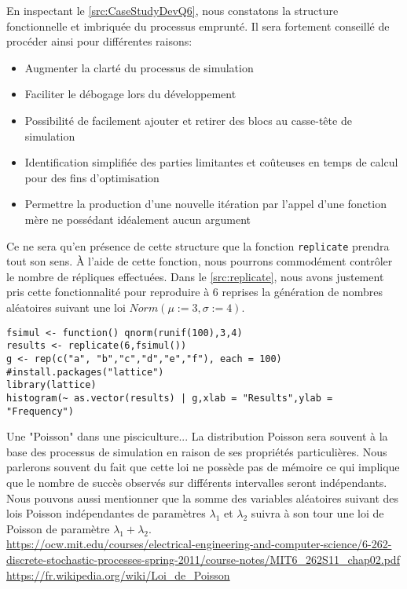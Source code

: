 En inspectant le \autoref{src:CaseStudyDevQ6}, nous constatons la structure fonctionnelle et imbriquée du processus emprunté. Il sera fortement conseillé de procéder ainsi pour différentes raisons:

\begin{itemize}
	\item Augmenter la clarté du processus de simulation
	\item Faciliter le débogage lors du développement
	\item Possibilité de facilement ajouter et retirer des blocs au casse-tête de simulation
	\item Identification simplifiée des parties limitantes et coûteuses en temps de calcul pour des fins d'optimisation
	\item Permettre la production d'une nouvelle itération par l'appel d'une fonction mère ne possédant idéalement aucun argument
\end{itemize}

Ce ne sera qu'en présence de cette structure que la fonction \texttt{replicate} prendra tout son sens. À l'aide de cette fonction, nous pourrons commodément contrôler le nombre de répliques effectuées. Dans le \autoref{src:replicate}, nous avons justement pris cette fonctionnalité pour reproduire à 6 reprises la génération de nombres aléatoires suivant une loi $Norm(\mu := 3, \sigma := 4)$.

\begin{lstlisting}[caption = Replication d'une analyse par simulation,label=src:replicate]
fsimul <- function() qnorm(runif(100),3,4)
results <- replicate(6,fsimul())
g <- rep(c("a", "b","c","d","e","f"), each = 100)
#install.packages("lattice")
library(lattice)
histogram(~ as.vector(results) | g,xlab = "Results",ylab = "Frequency") 
\end{lstlisting}


\begin{moreInfo}{Une "Poisson" dans une pisciculture...}
	La distribution Poisson sera souvent à la base des processus de simulation en raison de ses propriétés particulières. Nous parlerons souvent du fait que cette loi ne possède pas de mémoire ce qui implique que le nombre de succès observés sur différents intervalles seront indépendants. Nous pouvons aussi mentionner que la somme des variables aléatoires suivant des lois Poisson indépendantes de paramètres $\lambda_1$ et $\lambda_2$ suivra à son tour une loi de Poisson de paramètre $\lambda_1 + \lambda_2$. \\
	\url{https://ocw.mit.edu/courses/electrical-engineering-and-computer-science/6-262-discrete-stochastic-processes-spring-2011/course-notes/MIT6_262S11_chap02.pdf} \\
	\url{https://fr.wikipedia.org/wiki/Loi_de_Poisson}
\end{moreInfo}